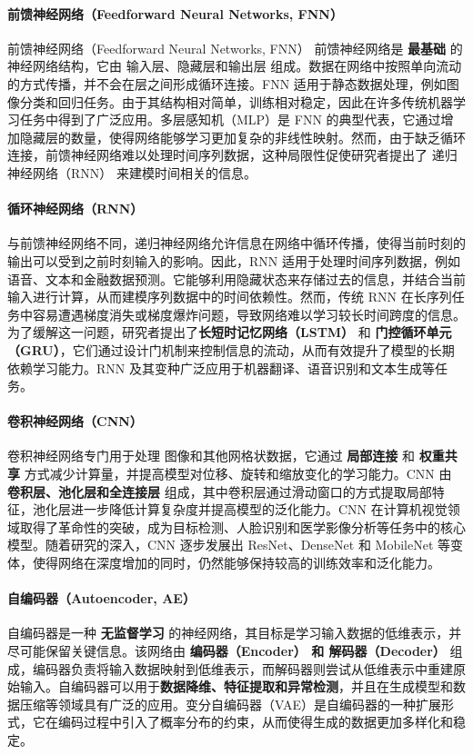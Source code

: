 \paragraph*{ 前馈神经网络（Feedforward Neural Networks, FNN）}

前馈神经网络（Feedforward Neural Networks, FNN）
前馈神经网络是 {\bf 最基础} 的神经网络结构，它由 输入层、隐藏层和输出层 组成。数据在网络中按照单向流动的方式传播，并不会在层之间形成循环连接。FNN 适用于静态数据处理，例如图像分类和回归任务。由于其结构相对简单，训练相对稳定，因此在许多传统机器学习任务中得到了广泛应用。多层感知机（MLP）是 FNN 的典型代表，它通过增加隐藏层的数量，使得网络能够学习更加复杂的非线性映射。然而，由于缺乏循环连接，前馈神经网络难以处理时间序列数据，这种局限性促使研究者提出了 递归神经网络（RNN） 来建模时间相关的信息。

\paragraph*{ 循环神经网络（RNN）}
与前馈神经网络不同，递归神经网络允许信息在网络中循环传播，使得当前时刻的输出可以受到之前时刻输入的影响。因此，RNN 适用于处理时间序列数据，例如语音、文本和金融数据预测。它能够利用隐藏状态来存储过去的信息，并结合当前输入进行计算，从而建模序列数据中的时间依赖性。然而，传统 RNN 在长序列任务中容易遭遇梯度消失或梯度爆炸问题，导致网络难以学习较长时间跨度的信息。为了缓解这一问题，研究者提出了{\bf  长短时记忆网络（LSTM）} 和 {\bf 门控循环单元（GRU）}，它们通过设计门机制来控制信息的流动，从而有效提升了模型的长期依赖学习能力。RNN 及其变种广泛应用于机器翻译、语音识别和文本生成等任务。

\paragraph*{ 卷积神经网络（CNN）}
卷积神经网络专门用于处理 图像和其他网格状数据，它通过 {\bf 局部连接} 和 {\bf 权重共享} 方式减少计算量，并提高模型对位移、旋转和缩放变化的学习能力。CNN 由 {\bf 卷积层、池化层和全连接层} 组成，其中卷积层通过滑动窗口的方式提取局部特征，池化层进一步降低计算复杂度并提高模型的泛化能力。CNN 在计算机视觉领域取得了革命性的突破，成为目标检测、人脸识别和医学影像分析等任务中的核心模型。随着研究的深入，CNN 逐步发展出 ResNet、DenseNet 和 MobileNet 等变体，使得网络在深度增加的同时，仍然能够保持较高的训练效率和泛化能力。

\paragraph*{ 自编码器（Autoencoder, AE）} 
自编码器是一种 {\bf 无监督学习} 的神经网络，其目标是学习输入数据的低维表示，并尽可能保留关键信息。该网络由 {\bf 编码器（Encoder） 和 解码器（Decoder）} 组成，编码器负责将输入数据映射到低维表示，而解码器则尝试从低维表示中重建原始输入。自编码器可以用于{\bf  数据降维、特征提取和异常检测}，并且在生成模型和数据压缩等领域具有广泛的应用。变分自编码器（VAE）是自编码器的一种扩展形式，它在编码过程中引入了概率分布的约束，从而使得生成的数据更加多样化和稳定。


